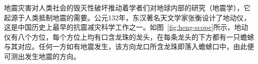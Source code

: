 地震灾害对人类社会的毁灭性破坏推动着学者们对地球内部的研究（地震学），它起源于人类抵制地震的需要。公元132年，东汉著名天文学家张衡设计了地动仪，这是中国历史上最早的抗震减灾科学工作之一\citep{stein2009introduction}。如图~\ref{fig:heng-scope}所示，地动仪有八个方位，每个方位上均有口含龙珠的龙头，在每条龙头的下方都有一只蟾蜍与其对应。任何一方如有地震发生，该方向龙口所含龙珠即落入蟾蜍口中，由此便可测出发生地震的方向\cite{seismoscopewiki}。
%
%
%
%
%

